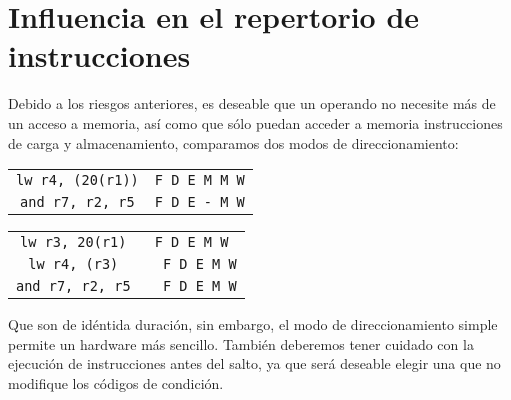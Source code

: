 \section{Influencia en el repertorio de instrucciones}
Debido a los riesgos anteriores, es deseable que un operando no necesite más de un acceso a memoria,
así como que sólo puedan acceder a memoria instrucciones de carga y almacenamiento, comparamos 
dos modos de direccionamiento:
\begin{center}
    \begin{minipage}{0.45\textwidth}
    \begin{tabular}{cc}
        \texttt{lw r4, (20(r1))} & \texttt{F D E M M W} \\
        \texttt{and r7, r2, r5} & \texttt{\qquad F D E - M W} \\
    \end{tabular}
    \end{minipage}
    \begin{minipage}{0.45\textwidth}
        \begin{tabular}{cc}
            \texttt{lw r3, 20(r1)} & \texttt{F D E M W} \\
            \texttt{lw r4, (r3)} & \texttt{ \quad \ F D E M W} \\
            \texttt{and r7, r2, r5} & \texttt{ \qquad \quad  \ F D E M W} \\
        \end{tabular}
    \end{minipage}
\end{center}
Que son de idéntida duración, sin embargo, el modo de direccionamiento simple permite un hardware más sencillo. 
También deberemos tener cuidado con la ejecución de instrucciones antes del salto, ya que será deseable elegir una que 
no modifique los códigos de condición.

